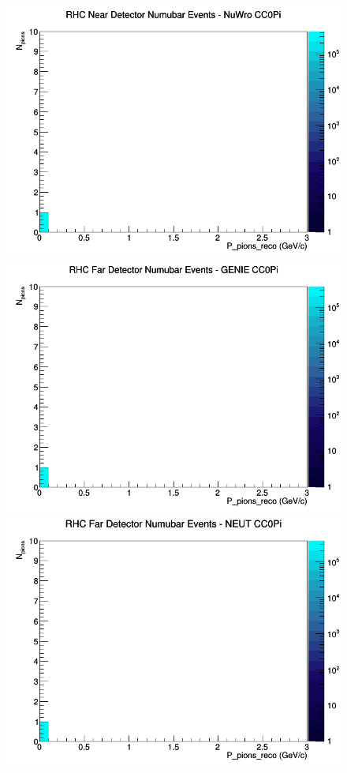 \documentclass[12pt]{article}
\begin{document}
\begin{figure}[h]
\includegraphics[width=\linewidth]{eff_N_P/GAr/pions/CC0Pi_RHC_ND_numubar_N_P_NuWro.png}
\endminipage
\newline
{}
\includegraphics[width=\linewidth]{eff_N_P/GAr/pions/CC0Pi_RHC_FD_numubar_N_P_GENIE.png}
\endminipage
{}
\includegraphics[width=\linewidth]{eff_N_P/GAr/pions/CC0Pi_RHC_FD_numubar_N_P_NEUT.png}

\end{figure}
\end{document}

